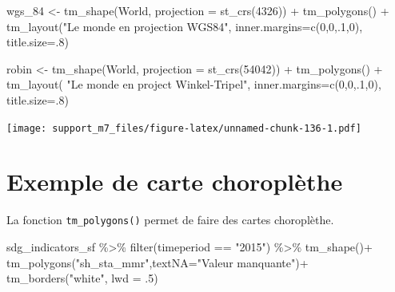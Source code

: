\documentclass[
]{book}
\newenvironment{Shaded}{\begin{snugshade}}{\end{snugshade}}
\newcommand{\AttributeTok}[1]{\textcolor[rgb]{0.77,0.63,0.00}{#1}}
\newcommand{\DecValTok}[1]{\textcolor[rgb]{0.00,0.00,0.81}{#1}}
\newcommand{\FunctionTok}[1]{\textcolor[rgb]{0.00,0.00,0.00}{#1}}
\newcommand{\NormalTok}[1]{#1}
\newcommand{\OtherTok}[1]{\textcolor[rgb]{0.56,0.35,0.01}{#1}}
\newcommand{\SpecialCharTok}[1]{\textcolor[rgb]{0.00,0.00,0.00}{#1}}
\newcommand{\StringTok}[1]{\textcolor[rgb]{0.31,0.60,0.02}{#1}}
\begin{document}
\begin{Shaded}
\begin{Highlighting}[]
\NormalTok{wgs\_84 }\OtherTok{\textless{}{-}} \FunctionTok{tm\_shape}\NormalTok{(World, }\AttributeTok{projection =} \FunctionTok{st\_crs}\NormalTok{(}\DecValTok{4326}\NormalTok{)) }\SpecialCharTok{+} 
    \FunctionTok{tm\_polygons}\NormalTok{() }\SpecialCharTok{+} 
\FunctionTok{tm\_layout}\NormalTok{(}\StringTok{"Le monde en projection WGS84"}\NormalTok{, }\AttributeTok{inner.margins=}\FunctionTok{c}\NormalTok{(}\DecValTok{0}\NormalTok{,}\DecValTok{0}\NormalTok{,.}\DecValTok{1}\NormalTok{,}\DecValTok{0}\NormalTok{), }\AttributeTok{title.size=}\NormalTok{.}\DecValTok{8}\NormalTok{)}

\NormalTok{robin }\OtherTok{\textless{}{-}} \FunctionTok{tm\_shape}\NormalTok{(World, }\AttributeTok{projection =} \FunctionTok{st\_crs}\NormalTok{(}\DecValTok{54042}\NormalTok{)) }\SpecialCharTok{+} 
    \FunctionTok{tm\_polygons}\NormalTok{() }\SpecialCharTok{+}
\FunctionTok{tm\_layout}\NormalTok{(}
\StringTok{"Le monde en project Winkel{-}Tripel"}\NormalTok{,}
    \AttributeTok{inner.margins=}\FunctionTok{c}\NormalTok{(}\DecValTok{0}\NormalTok{,}\DecValTok{0}\NormalTok{,.}\DecValTok{1}\NormalTok{,}\DecValTok{0}\NormalTok{), }\AttributeTok{title.size=}\NormalTok{.}\DecValTok{8}\NormalTok{)}
\end{Highlighting}
\end{Shaded}

\texttt{[image: support\_m7\_files/figure-latex/unnamed-chunk-136-1.pdf]}

\hypertarget{exemple-de-carte-choropluxe8the}{%
\section{Exemple de carte choroplèthe}\label{exemple-de-carte-choropluxe8the}}

La fonction \texttt{tm\_polygons()} permet de faire des cartes choroplèthe.

\begin{Shaded}
\begin{Highlighting}[]
\NormalTok{sdg\_indicators\_sf }\SpecialCharTok{\%\textgreater{}\%} 
  \FunctionTok{filter}\NormalTok{(timeperiod }\SpecialCharTok{==} \StringTok{"2015"}\NormalTok{) }\SpecialCharTok{\%\textgreater{}\%} 
  \FunctionTok{tm\_shape}\NormalTok{()}\SpecialCharTok{+}
  \FunctionTok{tm\_polygons}\NormalTok{(}\StringTok{"sh\_sta\_mmr"}\NormalTok{,}\AttributeTok{textNA=}\StringTok{"Valeur manquante"}\NormalTok{)}\SpecialCharTok{+}
  \FunctionTok{tm\_borders}\NormalTok{(}\StringTok{"white"}\NormalTok{, }\AttributeTok{lwd =}\NormalTok{ .}\DecValTok{5}\NormalTok{)}
\end{Highlighting}
\end{Shaded}
\end{document}
